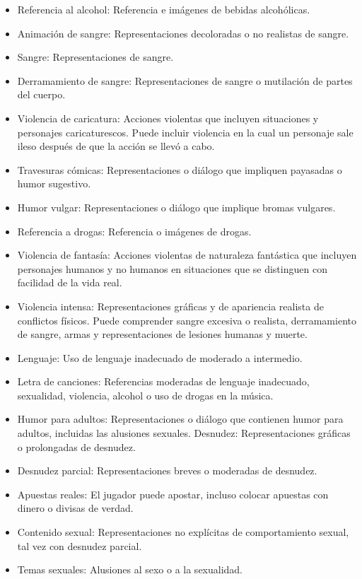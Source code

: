 			
			\begin{itemize}
				\item Referencia al alcohol: Referencia e imágenes de bebidas alcohólicas.
				\item Animación de sangre: Representaciones decoloradas o no realistas de sangre.
				\item Sangre: Representaciones de sangre.
				\item Derramamiento de sangre: Representaciones de sangre o mutilación de partes del cuerpo.
				\item Violencia de caricatura: Acciones violentas que incluyen situaciones y personajes caricaturescos. Puede incluir violencia en la cual un personaje sale ileso después de que la acción se llevó a cabo.
				\item Travesuras cómicas: Representaciones o diálogo que impliquen payasadas o humor sugestivo.
				\item Humor vulgar: Representaciones o diálogo que implique bromas vulgares.
				\item Referencia a drogas: Referencia o imágenes de drogas.
				\item Violencia de fantasía: Acciones violentas de naturaleza fantástica que incluyen personajes humanos y no humanos en situaciones que se distinguen con facilidad de la vida real.
				\item Violencia intensa: Representaciones gráficas y de apariencia realista de conflictos físicos. Puede comprender sangre excesiva o realista, derramamiento de sangre, armas y representaciones de lesiones humanas y muerte.
				\item Lenguaje: Uso de lenguaje inadecuado de moderado a intermedio.
				\item Letra de canciones: Referencias moderadas de lenguaje inadecuado, sexualidad, violencia, alcohol o uso de drogas en la música.
				\item Humor para adultos: Representaciones o diálogo que contienen humor para adultos, incluidas las alusiones sexuales.
				Desnudez: Representaciones gráficas o prolongadas de desnudez.
				\item Desnudez parcial: Representaciones breves o moderadas de desnudez.
				\item Apuestas reales: El jugador puede apostar, incluso colocar apuestas con dinero o divisas de verdad.
				\item Contenido sexual: Representaciones no explícitas de comportamiento sexual, tal vez con desnudez parcial.
				\item Temas sexuales: Alusiones al sexo o a la sexualidad.

\end{itemize}
